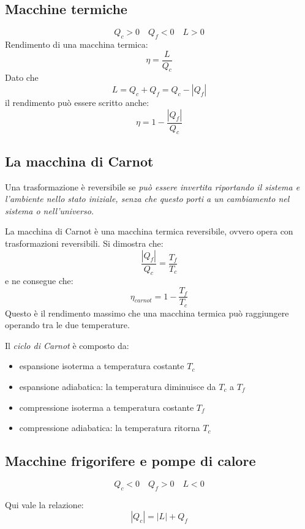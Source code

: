 \documentclass[12pt]{article}
\begin{document}
\subsection{Macchine termiche}
$$ Q_c > 0 \hspace{1em} Q_f < 0 \hspace{1em} L > 0 $$
Rendimento di una macchina termica:
$$ \eta = \frac{L}{Q_c} $$
Dato che
$$ L = Q_c + Q_f = Q_c - |Q_f| $$
il rendimento può essere scritto anche:
$$ \eta = 1 - \frac{|Q_f|}{Q_c} $$

\subsection{La macchina di Carnot}
Una trasformazione è reversibile se \textit{può essere invertita riportando il sistema e l'ambiente nello stato iniziale, senza che questo porti a un cambiamento nel sistema o nell'universo.} 

\vspace{1em}

La macchina di Carnot è una macchina termica reversibile, ovvero opera con trasformazioni reversibili. Si dimostra che:
$$ \frac{|Q_f|}{Q_c} = \frac{T_f}{T_c} $$
e ne consegue che:
$$ \eta_{carnot} = 1 - \frac{T_f}{T_c} $$
Questo è il rendimento massimo che una macchina termica può raggiungere operando tra le due temperature.

\vspace{1em}

Il \textit{ciclo di Carnot} è composto da:
\begin{itemize}
    \item espansione isoterma a temperatura costante $T_c$
    \item espansione adiabatica: la temperatura diminuisce da $T_c$ a $T_f$
    \item compressione isoterma a temperatura costante $T_f$
    \item compressione adiabatica: la temperatura ritorna $T_c$
\end{itemize}

\subsection{Macchine frigorifere e pompe di calore}
$$ Q_c < 0 \hspace{1em} Q_f > 0 \hspace{1em} L < 0 $$

Qui vale la relazione:
$$ |Q_c| = |L| + Q_f $$
\end{document}
